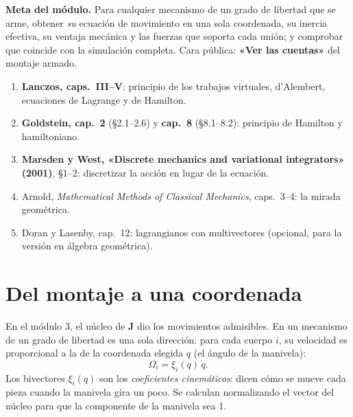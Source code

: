 \documentclass[11pt,a4paper]{article}
\begin{document}
\maketitle
\vspace{-2.5em}

\begin{meta}
\textbf{\textcolor{amarillo}{Meta del módulo.}} Para cualquier mecanismo de un grado de libertad que se arme, obtener
\emph{su} ecuación de movimiento en una sola coordenada, su inercia efectiva, su ventaja mecánica y las fuerzas que
soporta cada unión; y comprobar que coincide con la simulación completa. Cara pública: \textbf{«Ver las cuentas»} del
montaje armado.
\end{meta}

\begin{lectura}
\begin{enumerate}[leftmargin=*]
  \item \textbf{Lanczos, caps.~III--V}: principio de los trabajos virtuales, d'Alembert, ecuaciones de Lagrange y de
        Hamilton.
  \item \textbf{Goldstein, cap.~2} (§2.1--2.6) y \textbf{cap.~8} (§8.1--8.2): principio de Hamilton y hamiltoniano.
  \item \textbf{Marsden y West, «Discrete mechanics and variational integrators» (2001)}, §1--2: discretizar la
        acción en lugar de la ecuación.
  \item Arnold, \emph{Mathematical Methods of Classical Mechanics}, caps.~3--4: la mirada geométrica.
  \item Doran y Lasenby, cap.~12: lagrangianos con multivectores (opcional, para la versión en álgebra geométrica).
\end{enumerate}
\end{lectura}

\section{Del montaje a una coordenada}

En el módulo 3, el núcleo de $\mathbf J$ dio los movimientos admisibles. En un mecanismo de un grado de libertad es
una sola dirección: para cada cuerpo $i$, su velocidad es proporcional a la de la coordenada elegida $q$ (el ángulo de
la manivela):
\begin{equation}
  \Omega_i = \xi_i(q)\,\dot q .
\end{equation}
Los bivectores $\xi_i(q)$ son los \emph{coeficientes cinemáticos}: dicen cómo se mueve cada pieza cuando la manivela
gira un poco. Se calculan normalizando el vector del núcleo para que la componente de la manivela sea 1.
\end{document}
